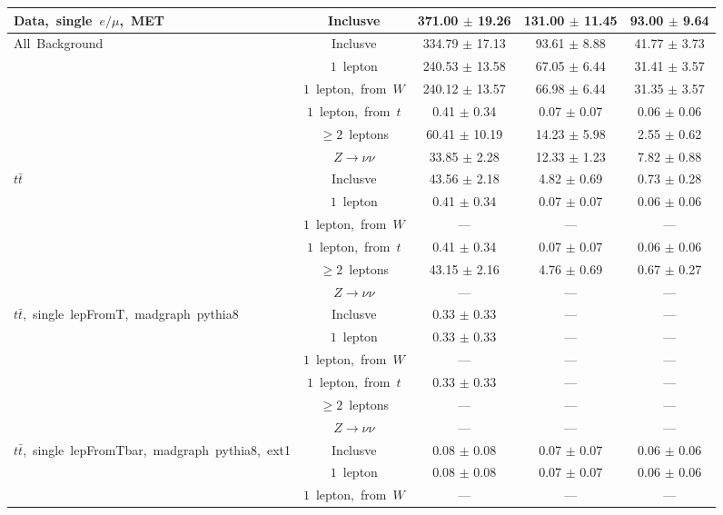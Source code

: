 \documentclass{article}
\begin{document}
\begin{longtable}{|l|c|c|c|c|}
\multirow{1}{*}{Data,~single~$e/\mu$,~MET} & Inclusve  & 371.00 $\pm$ 19.26  & 131.00 $\pm$ 11.45  & 93.00 $\pm$ 9.64 \\* 
\hline \hline 
\multirow{6}{*}{All~Background} & Inclusve  & 334.79 $\pm$ 17.13  & 93.61 $\pm$ 8.88  & 41.77 $\pm$ 3.73 \\* 
 & $1$~lepton  & 240.53 $\pm$ 13.58  & 67.05 $\pm$ 6.44  & 31.41 $\pm$ 3.57 \\* 
 & $1$~lepton,~from~$W$  & 240.12 $\pm$ 13.57  & 66.98 $\pm$ 6.44  & 31.35 $\pm$ 3.57 \\* 
 & $1$~lepton,~from~$t$  & 0.41 $\pm$ 0.34  & 0.07 $\pm$ 0.07  & 0.06 $\pm$ 0.06 \\* 
 & $\ge2$~leptons  & 60.41 $\pm$ 10.19  & 14.23 $\pm$ 5.98  & 2.55 $\pm$ 0.62 \\* 
 & $Z\rightarrow\nu\nu$  & 33.85 $\pm$ 2.28  & 12.33 $\pm$ 1.23  & 7.82 $\pm$ 0.88 \\* 
\hline 
\multirow{6}{*}{$t\bar{t}$} & Inclusve  & 43.56 $\pm$ 2.18  & 4.82 $\pm$ 0.69  & 0.73 $\pm$ 0.28 \\* 
 & $1$~lepton  & 0.41 $\pm$ 0.34  & 0.07 $\pm$ 0.07  & 0.06 $\pm$ 0.06 \\* 
 & $1$~lepton,~from~$W$  & ---  & ---  & --- \\* 
 & $1$~lepton,~from~$t$  & 0.41 $\pm$ 0.34  & 0.07 $\pm$ 0.07  & 0.06 $\pm$ 0.06 \\* 
 & $\ge2$~leptons  & 43.15 $\pm$ 2.16  & 4.76 $\pm$ 0.69  & 0.67 $\pm$ 0.27 \\* 
 & $Z\rightarrow\nu\nu$  & ---  & ---  & --- \\* 
\hline 
\multirow{6}{*}{$t\bar{t}$,~single~lepFromT,~madgraph~pythia8} & Inclusve  & 0.33 $\pm$ 0.33  & ---  & --- \\* 
 & $1$~lepton  & 0.33 $\pm$ 0.33  & ---  & --- \\* 
 & $1$~lepton,~from~$W$  & ---  & ---  & --- \\* 
 & $1$~lepton,~from~$t$  & 0.33 $\pm$ 0.33  & ---  & --- \\* 
 & $\ge2$~leptons  & ---  & ---  & --- \\* 
 & $Z\rightarrow\nu\nu$  & ---  & ---  & --- \\* 
\hline 
\multirow{6}{*}{$t\bar{t}$,~single~lepFromTbar,~madgraph~pythia8,~ext1} & Inclusve  & 0.08 $\pm$ 0.08  & 0.07 $\pm$ 0.07  & 0.06 $\pm$ 0.06 \\* 
 & $1$~lepton  & 0.08 $\pm$ 0.08  & 0.07 $\pm$ 0.07  & 0.06 $\pm$ 0.06 \\* 
 & $1$~lepton,~from~$W$  & ---  & ---  & --- \\* 

\end{longtable}
\end{document}
